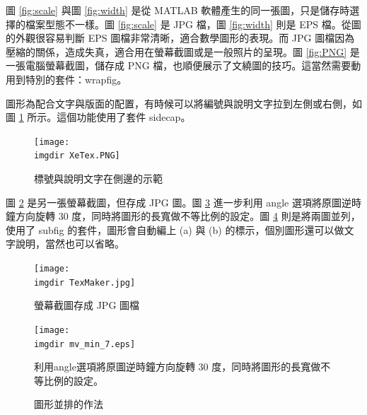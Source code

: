 圖 \ref{fig:scale} 與圖  \ref{fig:width} 是從 MATLAB 軟體產生的同一張圖，只是儲存時選擇的檔案型態不一樣。圖 \ref{fig:scale} 是 JPG 檔，圖  \ref{fig:width} 則是 EPS 檔。從圖的外觀很容易判斷 EPS 圖檔非常清晰，適合數學圖形的表現。而 {\C JPG} 圖檔因為壓縮的關係，造成失真，適合用在螢幕截圖或是一般照片的呈現。圖 \ref{fig:PNG} 是一張電腦螢幕截圖，儲存成 PNG 檔，也順便展示了文繞圖的技巧。這當然需要動用到特別的套件：wrapfig。

圖形為配合文字與版面的配置，有時候可以將編號與說明文字拉到左側或右側，如圖 \ref{fig:side} 所示。這個功能使用了套件 sidecap。
\begin{figure}  %
\caption{標號與說明文字在側邊的示範}
\texttt{[image: \\imgdir XeTex.PNG]}
\label{fig:side}
\end{figure}



圖 \ref{fig:JPG} 是另一張螢幕截圖，但存成 JPG 圖。圖 \ref{fig:angle} 進一步利用 angle 選項將原圖逆時鐘方向旋轉 30 度，同時將圖形的長寬做不等比例的設定。圖 \ref{fig:parallel} 則是將兩圖並列，使用了 subfig 的套件，圖形會自動編上 (a) 與 (b) 的標示，個別圖形還可以做文字說明，當然也可以省略。

\begin{figure}[h]
    \centering
        \texttt{[image: \\imgdir TexMaker.jpg]}
    \caption{螢幕截圖存成 JPG 圖檔}
    \label{fig:JPG}
\end{figure}

 

\begin{figure}[H]
    \centering
        \texttt{[image: \\imgdir mv\_min\_7.eps]}
    \caption{利用angle選項將原圖逆時鐘方向旋轉 30 度，同時將圖形的長寬做不等比例的設定。}
    \label{fig:angle}
\end{figure}

\begin{figure}[H]
    \centering
    \caption{圖形並排的作法}
    \label{fig:parallel}
\end{figure}

